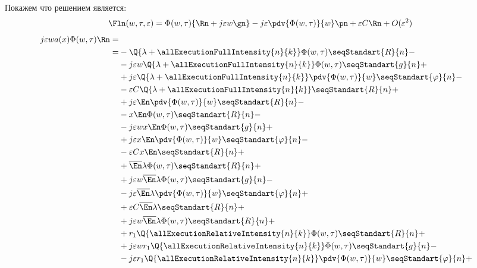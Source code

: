 Покажем что решением является:
\begin{equation}
\Fln(w, \tau, \varepsilon) = \Phi(w, \tau) \{\Rn + j\varepsilon w \gn \}
    - j \varepsilon \pdv{\Phi (w, \tau)}{w} \pn + \varepsilon C \Rn
    + O(\varepsilon^2) 
\end{equation}
{\allowdisplaybreaks\begin{align*}
j\varepsilon wa(x) \Phi (w, \tau) \Rn = \\=
    &-\Q{\lambda+\allExecutionFullIntensity{n}{k}}
        \Phi(w, \tau)\seqStandart{R}{n}-\\
    &-j\varepsilon w\Q{\lambda+\allExecutionFullIntensity{n}{k}}
        \Phi(w, \tau)\seqStandart{g}{n}+\\
    &+j\varepsilon\Q{\lambda+\allExecutionFullIntensity{n}{k}}
        \pdv{\Phi(w,\tau)}{w}\seqStandart{\varphi}{n}-\\
    &-\varepsilon C \Q{\lambda+\allExecutionFullIntensity{n}{k}}
        \seqStandart{R}{n}+\\
    &+j \varepsilon \En \pdv{\Phi(w,\tau)}{w}
        \seqStandart{R}{n} - \\
    &-x \En \Phi(w, \tau) \seqStandart{R}{n} - \\
    &-j \varepsilon w x \En \Phi(w, \tau) \seqStandart{g}{n} + \\
    &+j \varepsilon x \En \pdv{\Phi(w,\tau)}{w} \seqStandart{\varphi}{n}- \\
    &-\varepsilon C x \En \seqStandart{R}{n} + \\
    &+\overline{\En} \lambda 
        \Phi(w, \tau)\seqStandart{R}{n}+\\
    &+j \varepsilon w \overline{\En} \lambda 
        \Phi(w, \tau)\seqStandart{g}{n}-\\
    &-j\varepsilon \overline{\En} \lambda 
        \pdv{\Phi(w, \tau)}{w}\seqStandart{\varphi}{n}+\\
    &+\varepsilon C \overline{\En} \lambda 
        \seqStandart{R}{n}+\\
    &+j \varepsilon w\overline{\En} \lambda  
        \Phi(w, \tau)\seqStandart{R}{n}+\\
    &+r_1 \Q{\allExecutionRelativeIntensity{n}{k}} 
        \Phi(w, \tau)\seqStandart{R}{n}+\\
    &+j \varepsilon w r_1 \Q{\allExecutionRelativeIntensity{n}{k}} 
        \Phi(w, \tau)\seqStandart{g}{n}-\\
    &-j \varepsilon r_1 \Q{\allExecutionRelativeIntensity{n}{k}} 
        \pdv{\Phi(w, \tau)}{w}\seqStandart{\varphi}{n}+\\

\end{align*}}
